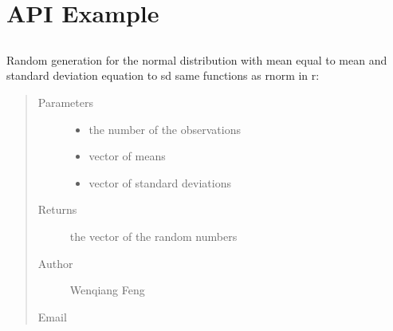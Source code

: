 \documentclass[letterpaper,11pt,english]{sphinxmanual}
\begin{document}
\begin{figure}[htbp]
\centering

\noindent{}
\end{figure}


\chapter{API Example}
\label{\detokenize{api:api-example}}\label{\detokenize{api:api}}\label{\detokenize{api::doc}}

\section{}
\label{\detokenize{api:module-statspy.basics}}\label{\detokenize{api:rnorm}}

\begin{fulllineitems}
\label{\detokenize{api:statspy.basics.rnorm}}
Random generation for the normal distribution with mean
equal to mean and standard deviation equation to sd
same functions as rnorm in r: 
\begin{quote}\begin{description}
\item[{Parameters}] \leavevmode\begin{itemize}
\item {} 
 \textendash{} the number of the observations

\item {} 
 \textendash{} vector of means

\item {} 
 \textendash{} vector of standard deviations

\end{itemize}

\item[{Returns}] \leavevmode
the vector of the random numbers

\item[{Author}] \leavevmode
Wenqiang Feng

\item[{Email}] \leavevmode
{}

\end{description}\end{quote}

\end{fulllineitems}
\end{document}
